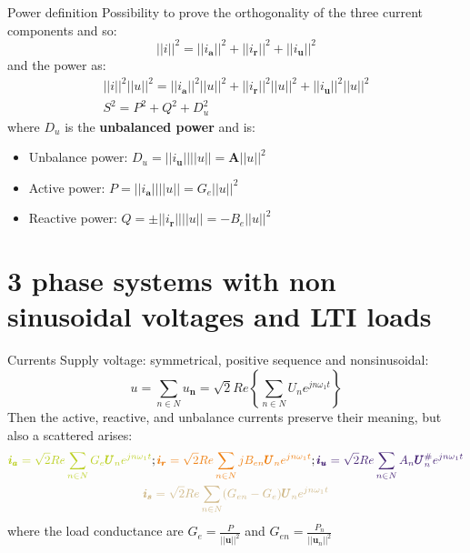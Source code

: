 \documentclass[aspectratio=169]{beamer}
\begin{document}
  \begin{frame}{Power definition}{\insertsection}
  Possibility to prove the orthogonality of the three current components and so:
  \begin{equation}
    ||\pmb{\mathit{i}}||^2 = ||\pmb{\mathit{i}_{a}}||^2 + ||\pmb{\mathit{i}_{r}}||^2 + ||\pmb{\mathit{i}_{u}}||^2
  \end{equation}
  and the power as:
  \begin{gather}
    ||\pmb{\mathit{i}}||^2||\pmb{\mathit{u}}||^2 = ||\pmb{\mathit{i}_{a}}||^2||\pmb{\mathit{u}}||^2 + ||\pmb{\mathit{i}_{r}}||^2||\pmb{\mathit{u}}||^2 + ||\pmb{\mathit{i}_{u}}||^2||\pmb{\mathit{u}}||^2\\
    S^2 = P^2 + Q^2 + D_u^2
  \end{gather}
  where $D_u$ is the \textbf{unbalanced power} and is:
  \begin{itemize}
    \item Unbalance power: $D_u = ||\pmb{\mathit{i}_{u}}|| ||\pmb{\mathit{u}}||= \pmb{A} ||\pmb{\mathit{u}}||^2$
    \item Active power: $P = ||\pmb{\mathit{i}_{a}}|| ||\pmb{\mathit{u}}||= G_e ||\pmb{\mathit{u}}||^2$
    \item Reactive power: $Q = \pm||\pmb{\mathit{i}_{r}}|| ||\pmb{\mathit{u}}||= -B_e ||\pmb{\mathit{u}}||^2$
  \end{itemize}
  \end{frame}

\section{3 phase systems with non sinusoidal voltages and LTI loads}

  \begin{frame}{Currents}{\insertsection}
    Supply voltage: symmetrical, positive sequence and nonsinusoidal:
    \begin{equation}
      \pmb{\mathit{u}} = \sum_{n\in N} \pmb{\mathit{u}_n} = \sqrt{2}Re\left\{\sum_{n\in N}\pmb{\textit{U}}_ne^{jn\omega_1 t}\right\}
    \end{equation}
Then the \textcolor{NTNU_green}{active}, \textcolor{NTNU_orange}{reactive}, and \textcolor{NTNU_purple}{unbalance} currents preserve their meaning, but also a \textcolor{NTNU_sand}{scattered} arises:
    \begin{gather}
      \textcolor{NTNU_green}{\pmb{i_a} = \sqrt{2}Re\sum_{n\in N}G_e\pmb{U}_n e^{jn\omega_{1} t}};
      \textcolor{NTNU_orange}{\pmb{i_r} = \sqrt{2}Re\sum_{n\in N}jB_{en}\pmb{U}_n e^{jn\omega_{1} t}};
      \textcolor{NTNU_purple}{\pmb{i_u} = \sqrt{2}Re\sum_{n\in N}A_{n}\pmb{U}_{n}^{\#} e^{jn\omega_{1} t}}\\
      \textcolor{NTNU_sand}{\pmb{i_s} = \sqrt{2}Re\sum_{n\in N}(G_{en} - G_e)\pmb{U}_n e^{jn\omega_{1} t}}
    \end{gather}
    where the load conductance are $G_e=\frac{P}{||\pmb{u}||^2}$ and $G_{en}=\frac{P_n}{||\pmb{u}_n||^2}$

  \end{frame}
\end{document}
